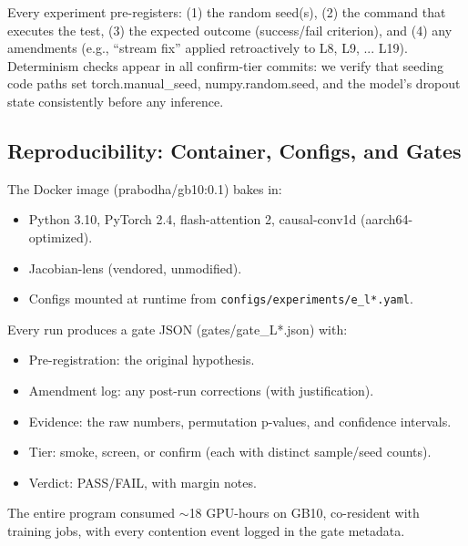 Every experiment pre-registers: (1) the random seed(s), (2) the command that executes the test,
(3) the expected outcome (success/fail criterion), and (4) any amendments (e.g., ``stream fix'' applied retroactively
to L8, L9, ... L19).
Determinism checks appear in all confirm-tier commits: we verify that seeding code paths set torch.manual\_seed,
numpy.random.seed, and the model's dropout state consistently before any inference.

\subsection*{Reproducibility: Container, Configs, and Gates}

The Docker image (prabodha/gb10:0.1) bakes in:
\begin{itemize}
\item Python 3.10, PyTorch 2.4, flash-attention 2, causal-conv1d (aarch64-optimized).
\item Jacobian-lens (vendored, unmodified).
\item Configs mounted at runtime from \texttt{configs/experiments/e\_l*.yaml}.
\end{itemize}

Every run produces a gate JSON (gates/gate\_L*.json) with:
\begin{itemize}
\item Pre-registration: the original hypothesis.
\item Amendment log: any post-run corrections (with justification).
\item Evidence: the raw numbers, permutation p-values, and confidence intervals.
\item Tier: smoke, screen, or confirm (each with distinct sample/seed counts).
\item Verdict: PASS/FAIL, with margin notes.
\end{itemize}

The entire program consumed $\sim$18 GPU-hours on GB10, co-resident with training jobs,
with every contention event logged in the gate metadata.
